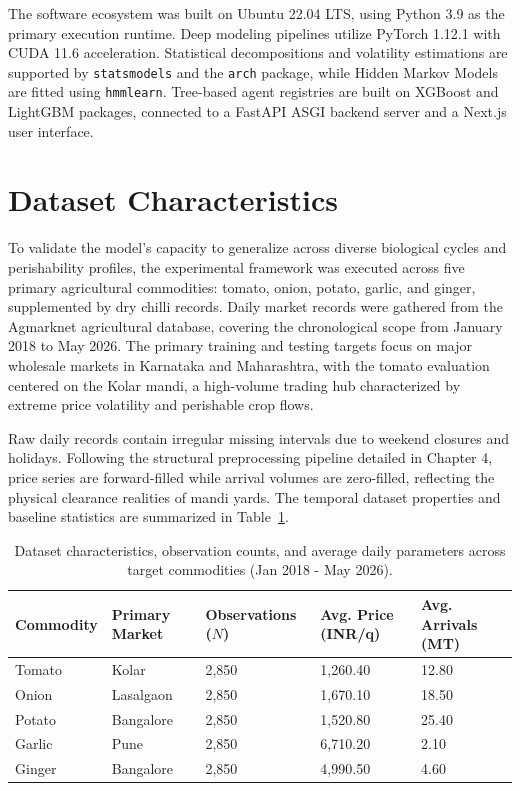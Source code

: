 \documentclass[12pt,a4paper]{report}
\theoremstyle{definition}
\theoremstyle{remark}
\begin{document}
The software ecosystem was built on Ubuntu 22.04 LTS, using Python 3.9 as the primary execution runtime. Deep modeling pipelines utilize PyTorch 1.12.1 with CUDA 11.6 acceleration. Statistical decompositions and volatility estimations are supported by \texttt{statsmodels} and the \texttt{arch} package, while Hidden Markov Models are fitted using \texttt{hmmlearn}. Tree-based agent registries are built on XGBoost and LightGBM packages, connected to a FastAPI ASGI backend server and a Next.js user interface.

\section{Dataset Characteristics}

To validate the model's capacity to generalize across diverse biological cycles and perishability profiles, the experimental framework was executed across five primary agricultural commodities: tomato, onion, potato, garlic, and ginger, supplemented by dry chilli records. Daily market records were gathered from the Agmarknet agricultural database, covering the chronological scope from January 2018 to May 2026. The primary training and testing targets focus on major wholesale markets in Karnataka and Maharashtra, with the tomato evaluation centered on the Kolar mandi, a high-volume trading hub characterized by extreme price volatility and perishable crop flows.

Raw daily records contain irregular missing intervals due to weekend closures and holidays. Following the structural preprocessing pipeline detailed in Chapter 4, price series are forward-filled while arrival volumes are zero-filled, reflecting the physical clearance realities of mandi yards. The temporal dataset properties and baseline statistics are summarized in Table~\ref{tab:dataset_characteristics}.

\begin{table}[htbp]
\centering
\caption{Dataset characteristics, observation counts, and average daily parameters across target commodities (Jan 2018 - May 2026).}
\label{tab:dataset_characteristics}
\begin{tabular}{p{2.5cm}|p{2.5cm}|p{2.5cm}|p{3.0cm}|p{3.0cm}}
\hline
\textbf{Commodity} & \textbf{Primary Market} & \textbf{Observations ($N$)} & \textbf{Avg. Price (INR/q)} & \textbf{Avg. Arrivals (MT)} \\
\hline
Tomato & Kolar & 2,850 & 1,260.40 & 12.80 \\
Onion & Lasalgaon & 2,850 & 1,670.10 & 18.50 \\
Potato & Bangalore & 2,850 & 1,520.80 & 25.40 \\
Garlic & Pune & 2,850 & 6,710.20 & 2.10 \\
Ginger & Bangalore & 2,850 & 4,990.50 & 4.60 \\
\hline
\end{tabular}
\end{table}
\end{document}
